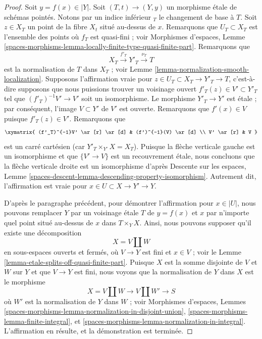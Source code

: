 \begin{proof}
\medskip\noindent
Soit $y = f(x) \in |Y|$. Soit $(T, t) \to (Y, y)$ un morphisme étale
de schémas pointés. Notons par un indice inférieur ${}_T$ le changement de base à $T$.
Soit $z \in X_T$ un point de la fibre $X_t$ situé au-dessus de $x$.
Remarquons que $U_T \subset X_T$ est l'ensemble des points où $f_T$ est
quasi-fini ; voir Morphismes d'espaces, Lemme
\ref{spaces-morphisms-lemma-locally-finite-type-quasi-finite-part}.
Remarquons que
$$
X_T \xrightarrow{f'_T} Y'_T \xrightarrow{\nu_T} T
$$
est la normalisation de $T$ dans $X_T$ ; voir
Lemme \ref{lemma-normalization-smooth-localization}.
Supposons l'affirmation vraie pour $z \in U_T \subset X_T \to Y'_T \to T$, c'est-à-dire
supposons que nous puissions trouver un voisinage ouvert
$f'_T(z) \in V' \subset Y'_T$ tel que $(f'_T)^{-1}V' \to V'$ soit un
isomorphisme. Le morphisme $Y'_T \to Y'$ est étale ; par conséquent, l'image
$V \subset Y'$ de $V'$ est ouverte. Remarquons que $f'(x) \in V$ puisque $f'_T(z) \in V'$.
Remarquons que
$$
\xymatrix{
(f'_T)^{-1}V' \ar[r] \ar[d] & (f')^{-1}(V) \ar[d] \\
V' \ar[r] & V
}
$$
est un carré cartésien (car $Y'_T \times_{Y'} X = X_T$).
Puisque la flèche verticale gauche est un isomorphisme
et que $\{V' \to V\}$ est un recouvrement étale, nous concluons que la flèche verticale
droite est un isomorphisme d'après
Descente sur les espaces, Lemme
\ref{spaces-descent-lemma-descending-property-isomorphism}.
Autrement dit, l'affirmation est vraie pour $x \in U \subset X \to Y' \to Y$.

\medskip\noindent
D'après le paragraphe précédent, pour démontrer l'affirmation pour
$x \in |U|$, nous pouvons remplacer $Y$ par un voisinage étale $T$ de
$y = f(x)$ et $x$ par n'importe quel point situé au-dessus de $x$ dans $T \times_Y X$.
Ainsi, nous pouvons supposer qu'il existe une décomposition
$$
X = V \amalg W
$$
en sous-espaces ouverts et fermés, où $V \to Y$ est fini et $x \in V$ ;
voir le Lemme \ref{lemma-etale-splits-off-quasi-finite-part}.
Puisque $X$ est la somme disjointe de $V$ et $W$ sur $Y$ et que
$V \to Y$ est fini, nous voyons que la
normalisation de $Y$ dans $X$ est le morphisme
$$
X = V \amalg W \longrightarrow V \amalg W' \longrightarrow S
$$
où $W'$ est la normalisation de $Y$ dans $W$ ; voir
Morphismes d'espaces, Lemmes
\ref{spaces-morphisms-lemma-normalization-in-disjoint-union},
\ref{spaces-morphisms-lemma-finite-integral}, et
\ref{spaces-morphisms-lemma-normalization-in-integral}.
L'affirmation en résulte, et la démonstration est terminée.
\end{proof}

